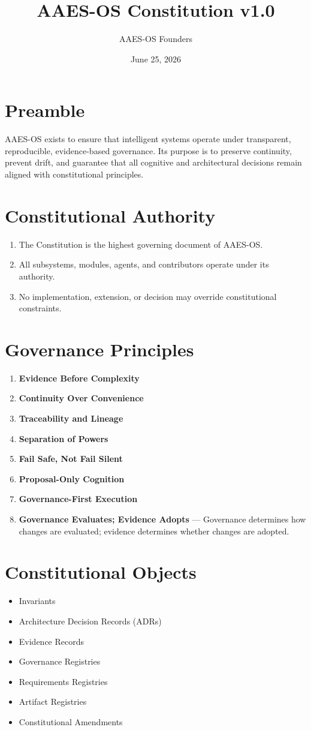 \documentclass[11pt]{article}
\title{AAES-OS Constitution v1.0}
\author{AAES-OS Founders}
\date{June 25, 2026}
\begin{document}
\maketitle

\section*{Preamble}
AAES-OS exists to ensure that intelligent systems operate under transparent, reproducible, evidence-based governance. Its purpose is to preserve continuity, prevent drift, and guarantee that all cognitive and architectural decisions remain aligned with constitutional principles.

\section{Constitutional Authority}
\begin{enumerate}[label=\arabic*.]
\item The Constitution is the highest governing document of AAES-OS.
\item All subsystems, modules, agents, and contributors operate under its authority.
\item No implementation, extension, or decision may override constitutional constraints.
\end{enumerate}

\section{Governance Principles}
\begin{enumerate}[label=\arabic*.]
\item \textbf{Evidence Before Complexity}
\item \textbf{Continuity Over Convenience}
\item \textbf{Traceability and Lineage}
\item \textbf{Separation of Powers}
\item \textbf{Fail Safe, Not Fail Silent}
\item \textbf{Proposal-Only Cognition}
\item \textbf{Governance-First Execution}
\item \textbf{Governance Evaluates; Evidence Adopts} --- Governance determines how changes are evaluated; evidence determines whether changes are adopted.
\end{enumerate}

\section{Constitutional Objects}
\begin{itemize}
\item Invariants
\item Architecture Decision Records (ADRs)
\item Evidence Records
\item Governance Registries
\item Requirements Registries
\item Artifact Registries
\item Constitutional Amendments
\end{itemize}
\end{document}
